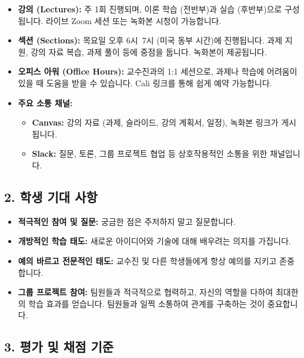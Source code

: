 \documentclass[11pt,a4paper]{article}
\begin{document}
\begin{itemize}
\begin{itemize}
    \item \textbf{강의 (Lectures):} 주 1회 진행되며, 이론 학습 (전반부)과 실습 (후반부)으로 구성됩니다. 라이브 Zoom 세션 또는 녹화본 시청이 가능합니다.
    \item \textbf{섹션 (Sections):} 목요일 오후 6시~7시 (미국 동부 시간)에 진행됩니다. 과제 지원, 강의 자료 복습, 과제 풀이 등에 중점을 둡니다. 녹화본이 제공됩니다.
    \item \textbf{오피스 아워 (Office Hours):} 교수진과의 1:1 세션으로, 과제나 학습에 어려움이 있을 때 도움을 받을 수 있습니다. Cali 링크를 통해 쉽게 예약 가능합니다.
    \item \textbf{주요 소통 채널:}
    \begin{itemize}
        \item \textbf{Canvas:} 강의 자료 (과제, 슬라이드, 강의 계획서, 일정), 녹화본 링크가 게시됩니다.
        \item \textbf{Slack:} 질문, 토론, 그룹 프로젝트 협업 등 상호작용적인 소통을 위한 채널입니다.
    \end{itemize}
\end{itemize}

\subsection*{2. 학생 기대 사항}

\begin{itemize}
    \item \textbf{적극적인 참여 및 질문:} 궁금한 점은 주저하지 말고 질문합니다.
    \item \textbf{개방적인 학습 태도:} 새로운 아이디어와 기술에 대해 배우려는 의지를 가집니다.
    \item \textbf{예의 바르고 전문적인 태도:} 교수진 및 다른 학생들에게 항상 예의를 지키고 존중합니다.
    \item \textbf{그룹 프로젝트 참여:} 팀원들과 적극적으로 협력하고, 자신의 역할을 다하여 최대한의 학습 효과를 얻습니다. 팀원들과 일찍 소통하여 관계를 구축하는 것이 중요합니다.
\end{itemize}

\subsection*{3. 평가 및 채점 기준}


\end{itemize}
\end{document}
